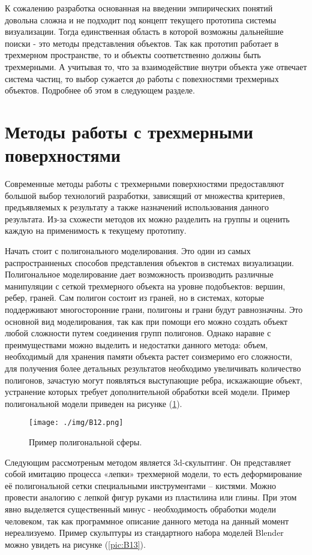 К сожалению разработка основанная на введении эмпирических понятий довольна сложна и не подходит под концепт текущего прототипа системы визуализации. Тогда единственная область в которой возможны дальнейшие поиски - это методы представления объектов. Так как прототип работает в трехмерном пространстве, то и объекты соответственно должны быть трехмерными. А учитывая то, что за взаимодействие внутри объекта уже отвечает система частиц, то выбор сужается до работы с повехностями трехмерных объектов. Подробнее об этом в следующем разделе.

\section{Методы работы с трехмерными поверхностями}

Современные методы работы с трехмерными поверхностями предоставляют большой выбор технологий разработки, зависящий от множества критериев, предъявляемых к результату а также назначений использования данного результата. Из-за схожести методов их можно разделить на группы и оценить каждую на применимость к текущему прототипу.

Начать стоит с полигонального моделирования. Это один из самых распространненых способов представления объектов в системах визуализации. Полигональное моделирование дает возможность производить различные манипуляции с сеткой трехмерного объекта на уровне подобъектов: вершин, ребер, граней. Сам полигон состоит из граней, но в системах, которые поддерживают многосторонние грани, полигоны и грани будут равнозначны.  Это основной вид моделирования, так как при помощи его можно создать объект любой сложности путем соединения групп полигонов. Однако наравне с преимуществами можно выделить и недостатки данного метода: объем, необходимый для хранения памяти объекта растет соизмеримо его сложности, для получения более детальных результатов необходимо увеличивать количество полигонов, зачастую могут появляться выступающие ребра, искажающие объект, устранение которых требует дополнительной обработки всей модели. Пример полигональной модели приведен на рисунке  (\ref{pic:B12}).

\begin{figure} 
\begin{center}
\texttt{[image: ./img/B12.png]}
\end{center}
\caption{Пример полигональной сферы.}
\label{pic:B12}
\end{figure}

Следующим рассмотреным методом является 3d-скульптинг. Он представляет собой имитацию процесса «лепки» трехмерной модели, то есть деформирование её полигональной сетки специальными инструментами – кистями. Можно провести аналогию с лепкой фигур руками из пластилина или глины. При этом явно выделяется существенный минус - необходимость обработки модели человеком, так как программное описание данного метода на данный момент нереализуемо. Пример скульптуры из стандартного набора моделей Blender можно увидеть на рисунке (\ref{pic:B13}).

